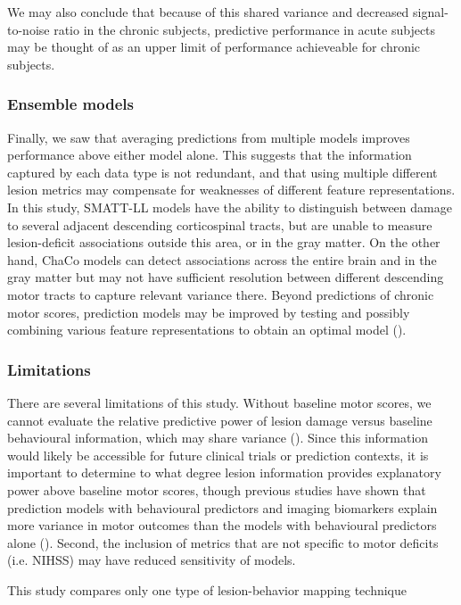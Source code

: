 \documentclass[10pt]{article}
\begin{document}
We may also conclude that because of this shared variance and decreased signal-to-noise ratio in the chronic subjects, predictive performance in acute subjects may be thought of as an upper limit of performance achieveable for chronic subjects. 

\subsubsection*{Ensemble models}
Finally, we saw that averaging predictions from multiple models improves performance above either model alone. This suggests that the information captured by each data type is not redundant, and that using multiple different lesion metrics may compensate for weaknesses of different feature representations. In this study, SMATT-LL models have the ability to distinguish between damage to several adjacent descending corticospinal tracts, but are unable to measure lesion-deficit associations outside this area, or in the gray matter. On the other hand, ChaCo models can detect associations across the entire brain and in the gray matter but may not have sufficient resolution between different descending motor tracts to capture relevant variance there. Beyond predictions of chronic motor scores, prediction models may be improved by testing and possibly combining various feature representations to obtain an optimal model (\cite{Kasties2021-rm}).

\subsubsection*{Limitations}
There are several limitations of this study. Without baseline motor scores, we cannot evaluate the relative predictive power of lesion damage versus baseline behavioural information, which may share variance (\cite{Feng2015-du, Bowren2022-rs}). Since this information would likely be accessible for future clinical trials or prediction contexts, it is important to determine to what degree lesion information provides explanatory power above baseline motor scores, though previous studies have shown that prediction models with behavioural predictors and imaging biomarkers explain more variance in motor outcomes than the models with behavioural predictors alone (\cite{Kim2017-xe, Feng2015-du}). Second, the inclusion of metrics that are not specific to motor deficits (i.e. NIHSS) may have reduced sensitivity of models. 

This study compares only one type of lesion-behavior mapping technique 
\end{document}
